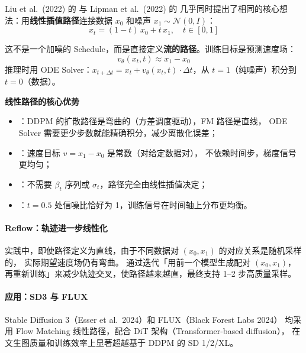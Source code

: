 Liu et al.\ (2022) 的  与 Lipman et al.\ (2022) 的 
几乎同时提出了相同的核心想法：用\textbf{线性插值路径}连接数据 $x_0$ 和噪声 $x_1 \sim \mathcal{N}(0,I)$：
\[
  x_t = (1-t)\,x_0 + t\,x_1, \quad t \in [0,1]
\]

这不是一个加噪的 Schedule，而是直接定义\textbf{流的路径}。训练目标是预测速度场：
\[
  v_\theta(x_t, t) \approx x_1 - x_0
\]
推理时用 ODE Solver：$x_{t+\Delta t} = x_t + v_\theta(x_t, t)\cdot\Delta t$，从 $t=1$（纯噪声）积分到 $t=0$（数据）。

\begin{conceptbox}
\textbf{线性路径的核心优势}

\begin{itemize}
  \item {}：DDPM 的扩散路径是弯曲的（方差调度驱动），FM 路径是直线，
        ODE Solver 需要更少步数就能精确积分，减少离散化误差；
  \item {}：速度目标 $v = x_1 - x_0$ 是常数（对给定数据对），
        不依赖时间步，梯度信号更均匀；
  \item {}：不需要 $\beta_t$ 序列或 $\sigma_t$，路径完全由线性插值决定；
  \item {}：$t=0.5$ 处信噪比恰好为 1，训练信号在时间轴上分布更均衡。
\end{itemize}
\end{conceptbox}

\paragraph{Reflow：轨迹进一步线性化}

实践中，即使路径定义为直线，由于不同数据对 $(x_0, x_1)$ 的对应关系是随机采样的，
实际期望速度场仍有弯曲。 通过迭代「用前一个模型生成配对 $(x_0, x_1)$，
再重新训练」来减少轨迹交叉，使路径越来越直，最终支持 1--2 步高质量采样。

\paragraph{应用：SD3 与 FLUX}

Stable Diffusion 3（Esser et al.\ 2024）和 FLUX（Black Forest Labs 2024）
均采用 Flow Matching 线性路径，配合 DiT 架构（Transformer-based diffusion），
在文生图质量和训练效率上显著超越基于 DDPM 的 SD 1/2/XL。

